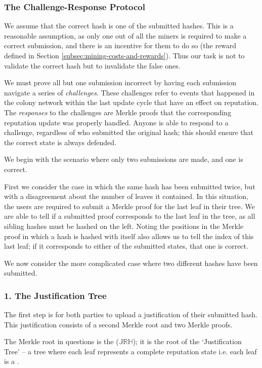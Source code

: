 \subsubsection{The Challenge-Response Protocol}

We assume that the correct hash is one of the  submitted hashes. This is a reasonable assumption, as only one out of all the miners is required to make a correct submission, and there is an incentive for them to do so (the reward defined in Section \ref{subsec:mining-costs-and-rewards}). Thus our task is not to validate the correct hash but to invalidate the false ones.

We must prove all but one submission incorrect by having each submission navigate a series of \emph{challenges}. These challenges refer to events that happened in the colony network within the last update cycle that have an effect on reputation. The \emph{responses} to the challenges are Merkle proofs that the corresponding reputation update was properly handled. Anyone is able to respond to a challenge, regardless of who submitted the original hash; this should ensure that the correct state is always defended.

We begin with the scenario where only two submissions are made, and one is correct. 

First we consider the case in which the same hash has been submitted twice, but with a disagreement about the number of leaves it contained. In this situation, the users are required to submit a Merkle proof for the last leaf in their tree. We are able to tell if a submitted proof corresponds to the last leaf in the tree, as all sibling hashes must be hashed on the left. Noting the positions in the Merkle proof in which a hash is hashed with itself also allows us to tell the index of this last leaf; if it corresponds to either of the submitted states, that one is correct.

We now consider the more complicated case where two different hashes have been submitted.

\subsubsection*{1. The Justification Tree}
  \newcommand{\jrh}{\ensuremath{\mathbb{JRH}}}
The first step is for both parties to upload a justification of their submitted hash. This justification consists of a second Merkle root and two Merkle proofs.

The Merkle root in questions is the  (\jrh); it is the root of the `Justification Tree' -- a tree where each leaf represents a complete reputation state i.e. each leaf is a . 

